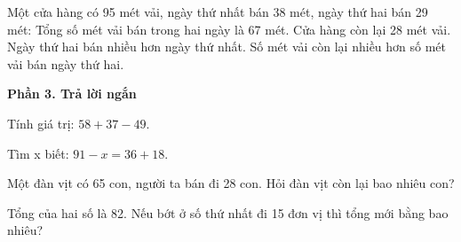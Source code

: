 \begin{ex} %
Một cửa hàng có 95 mét vải, ngày thứ nhất bán 38 mét, ngày thứ hai bán 29 mét:
\choiceTF
{\True Tổng số mét vải bán trong hai ngày là 67 mét.}
{\True Cửa hàng còn lại 28 mét vải.}
{Ngày thứ hai bán nhiều hơn ngày thứ nhất.}
{Số mét vải còn lại nhiều hơn số mét vải bán ngày thứ hai.}
\end{ex}

\textbf{Phần 3. Trả lời ngắn}

\begin{ex} %
Tính giá trị: $58 + 37 - 49$.
\end{ex}

\begin{ex} %
Tìm x biết: $91 - x = 36 + 18$.
\end{ex}

\begin{ex} %
Một đàn vịt có 65 con, người ta bán đi 28 con. Hỏi đàn vịt còn lại bao nhiêu con?
\end{ex}

\begin{ex} %
Tổng của hai số là 82. Nếu bớt ở số thứ nhất đi 15 đơn vị thì tổng mới bằng bao nhiêu?
\end{ex}

